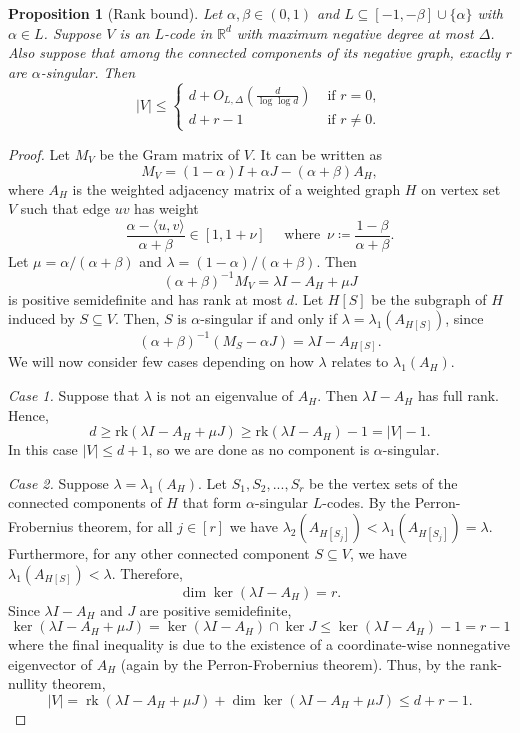 \documentclass[reqno, 11pt]{amsart}
\newtheorem{proposition}[theorem]{Proposition}
\theoremstyle{definition}
\theoremstyle{remark}
\newcommand{\abs}[1]{\left\lvert#1\right\rvert}
\newcommand{\paren}[1]{\left( #1 \right)}
\newcommand{\RR}{\mathbb{R}}
\begin{document}
\begin{proposition}[Rank bound]\label{prop:rank-bound}
Let $\alpha, \beta \in (0,1)$ and $L \subseteq [-1,-\beta] \cup \{\alpha\}$ with $\alpha \in L$.
Suppose $V$ is an $L$-code in $\RR^d$ with maximum negative degree at most $\Delta$.
Also suppose that among the connected components of its negative graph, exactly $r$ are $\alpha$-singular. 
Then
\[
\abs{V} \leq \begin{cases}
					d + O_{L,\Delta}\paren{\frac{d}{\log \log d}} & \text{ if } r = 0, \\
					d + r - 1 & \text{ if } r \neq 0.
				\end{cases}	
\]
\end{proposition}


\begin{proof}
Let $M_V$ be the Gram matrix of $V$. It can be written as
			\[
				M_V = (1-\alpha)I + \alpha J - (\alpha + \beta) A_H,
			\]
		where $A_H$ is the weighted adjacency matrix of a weighted graph $H$ on vertex set $V$ such that edge $uv$ has weight
			\[
				\frac{\alpha -\langle u, v \rangle}{\alpha + \beta} \in [1, 1 + \nu] \quad \text{ where } \, \nu \coloneqq \frac{1 - \beta}{\alpha + \beta}.
			\]
		Let $\mu = \alpha / (\alpha + \beta)$ and $\lambda = (1-\alpha)/(\alpha + \beta)$. Then
			\[
				(\alpha + \beta)^{-1}M_V = \lambda I - A_H + \mu J
			\]
		is positive semidefinite and has rank at most $d$. 
  Let $H[S]$ be the subgraph of $H$ induced by $S\subseteq V$. Then, $S$ is $\alpha$-singular if and only if $\lambda =  \lambda_1(A_{H[S]})$, since
		\[
			(\alpha + \beta)^{-1}(M_S - \alpha J) = \lambda I - A_{H[S]}.
		\]
		We will now consider few cases depending on how $\lambda$ relates to $\lambda_1(A_H)$.
		
		
\textit{Case 1.} Suppose that  $\lambda$ is not an eigenvalue of $A_H$. Then  $\lambda I - A_H$ has full rank. Hence,
				\[
					d \geq \mathrm{rk}(\lambda I - A_H + \mu J) \geq \mathrm{rk}(\lambda I - A_H) - 1 = |V| - 1.
				\]
			In this case $|V| \leq d + 1$, so we are done as no component is $\alpha$-singular.
						
\textit{Case 2.} Suppose $\lambda = \lambda_1(A_H)$. Let $S_1, S_2, ..., S_r$ be the vertex sets of the connected components of $H$ that form $\alpha$-singular  $L$-codes. By the Perron-Frobernius theorem, for all $j \in [r]$ we have $\lambda_2(A_{H[S_j]}) < \lambda_1(A_{H[S_j]}) = \lambda$. Furthermore, for any other connected component $S \subseteq V$, we have $\lambda_1(A_{H[S]}) < \lambda$. Therefore, 
				\[
					\dim \ker(\lambda I - A_H) = r.
				\]
			Since $\lambda I - A_H$ and $J$ are positive semidefinite, 
				\[
					\ker(\lambda I - A_H + \mu J) = \ker(\lambda I - A_H) \cap \ker J \le \ker(\lambda I - A_H) - 1 = r-1
				\]
    where the final inequality is due to the existence of a coordinate-wise nonnegative eigenvector of $A_H$ (again by the Perron-Frobernius theorem).
    Thus, by the  rank-nullity theorem,
    \[
    \abs{V} = \operatorname{rk}(\lambda I - A_H + \mu J) + \dim\ker (\lambda I - A_H + \mu J) \le d+ r-1.
    \]


\end{proof}
\end{document}
